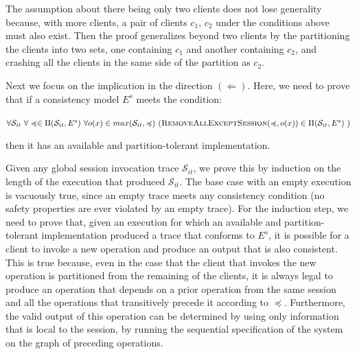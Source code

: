 \documentclass[journal,compsoc]{IEEEtran}
\begin{document}
The assumption about there being only two clients does not lose generality because, with more clients, a pair of clients $c_1$, $c_2$ under the conditions above must also exist. Then the proof generalizes beyond two clients by the partitioning the clients into two sets, one containing $c_1$ and another containing $c_2$, and crashing all the clients in the same side of the partition as $c_2$.

Next we focus on the implication in the direction $(\Leftarrow)$. Here, we need to prove that if a consistency model $E^s$ meets the condition:

\noindent $\forall \mathcal{S}_{it} ~ \forall \preccurlyeq \in \Pi(\mathcal{S}_{it},E^s) ~ \forall o(x) \in max(\mathcal{S}_{it}, \preccurlyeq) ~ (\textsc{RemoveAllExceptSession}(\preccurlyeq,o(x)) \in \Pi(\mathcal{S}_{it},E^s) ~ ) $

then it has an available and partition-tolerant implementation. 



Given any global session invocation trace $\mathcal{S}_{it}$, we prove this by induction on the length of the execution that produced $\mathcal{S}_{it}$. The base case with an empty execution is vacuously true, since an empty trace meets any consistency condition (no safety properties are ever violated by an empty trace). For the induction step, we need to prove that, given an execution for which an available and partition-tolerant implementation produced a trace that conforms to $E^s$, it is possible for a client to invoke a new operation and produce an output that is also consistent. This is true because, even in the case that the client that invokes the new operation is partitioned from the remaining of the clients, it is always legal to produce an operation that depends on a prior operation from the same session and all the operations that transitively precede it according to $\preccurlyeq$. Furthermore, the valid output of this operation can be determined by using only information that is local to the session, by running the sequential specification of the system on the graph of preceding operations.

 
\end{document}
